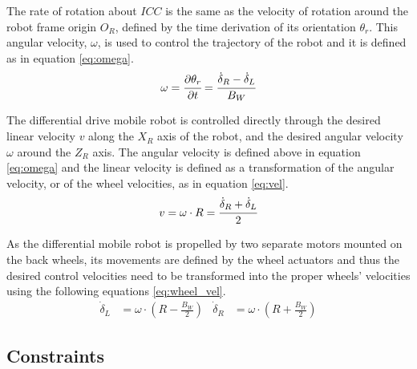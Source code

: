 The rate of rotation about $ICC$ is the same as the velocity of rotation around the robot frame origin $O_R$, defined by the time derivation of its orientation $\theta_r$. This angular velocity, $\omega$, is used to control the trajectory of the robot and it is defined as in equation \eqref{eq:omega}.
\begin{equation}
    \omega = \cfrac{\partial{\theta_r}}{\partial{t}} = \cfrac{\dot \delta_R - \dot \delta_L}{B_W}
    \label{eq:omega}
\end{equation}

The differential drive mobile robot is controlled directly through the desired linear velocity $v$ along the $X_R$ axis of the robot, and the desired angular velocity $\omega$ around the $Z_R$ axis.
The angular velocity is defined above in equation \eqref{eq:omega} and the linear velocity is defined as a transformation of the angular velocity, or of the wheel velocities, as in equation \eqref{eq:vel}.
\begin{equation}
    v = \omega \cdot R = \cfrac{\dot \delta_R + \dot \delta_L}{2}
    \label{eq:vel}
\end{equation}

As the differential mobile robot is propelled by two separate motors mounted on the back wheels, its movements are defined by the wheel actuators and thus the desired control velocities need to be transformed into the proper wheels' velocities using the following equations \eqref{eq:wheel_vel}.
\begin{align}
    \dot \delta _L  & =\omega \cdot ( R - \frac{B_W}{2} ) &
    \dot \delta _R  & = \omega \cdot ( R + \frac{B_W}{2}) 
    \label{eq:wheel_vel}
\end{align}


\subsection{Constraints}
\label{sec:constraints}


